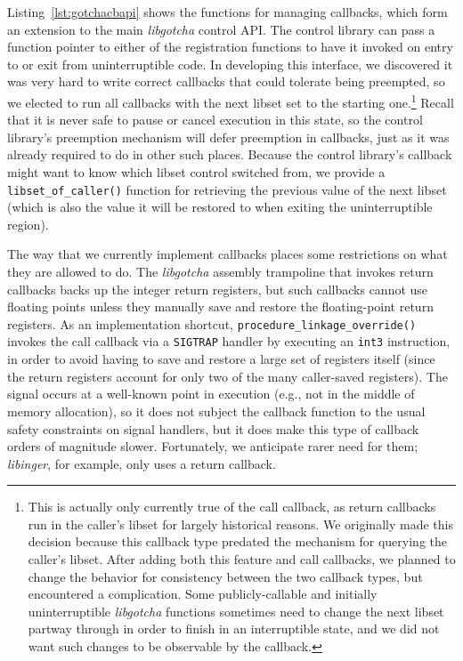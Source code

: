 Listing~\ref{lst:gotchacbapi} shows the functions for managing callbacks, which form
an extension to the main \textit{libgotcha} control API.  The control library can
pass a function pointer to either of the registration functions to have it invoked on
entry to or exit from uninterruptible code.  In developing this interface, we
discovered it was very hard to write correct callbacks that could tolerate being
preempted, so we elected to run all callbacks with the next libset set to the
starting one.\footnote{This is actually only currently true of the call callback, as
return callbacks run in the caller's libset for largely historical reasons.  We
originally made this decision because this callback type predated the mechanism for
querying the caller's libset.  After adding both this feature and call callbacks, we
planned to change the behavior for consistency between the two callback types, but
encountered a complication.  Some publicly-callable and initially uninterruptible
\textit{libgotcha} functions sometimes need to change the next libset partway through
in order to finish in an interruptible state, and we did not want such changes to be
observable by the callback.}
Recall that it is never safe to pause or cancel execution in this
state, so the control library's preemption mechanism will defer preemption in
callbacks, just as it was already required to do in other such places.  Because the
control library's callback might want to know which libset control switched from, we
provide a \texttt{libset\_of\_caller()} function for retrieving the previous value of
the next libset (which is also the value it will be restored to when exiting the
uninterruptible region).

\begin{sloppypar}
The way that we currently implement callbacks places some restrictions on what they
are allowed to do.  The \textit{libgotcha} assembly trampoline that invokes return
callbacks backs up the integer return registers, but such callbacks cannot use
floating points unless they manually save and restore the floating-point return
registers.  As an implementation shortcut, \texttt{procedure\_linkage\_override()}
invokes the call callback via a \texttt{SIGTRAP} handler by executing an
\texttt{int3} instruction, in order to avoid having to save and restore a large set
of registers itself (since the return registers account for only two of the many
caller-saved registers).  The signal occurs at a well-known point in execution (e.g.,
not in the middle of memory allocation), so it does not subject the callback function
to the usual safety constraints on signal handlers, but it does make this type of
callback orders of magnitude slower.  Fortunately, we anticipate rarer need for them;
\textit{libinger}, for example, only uses a return callback.
\end{sloppypar}


